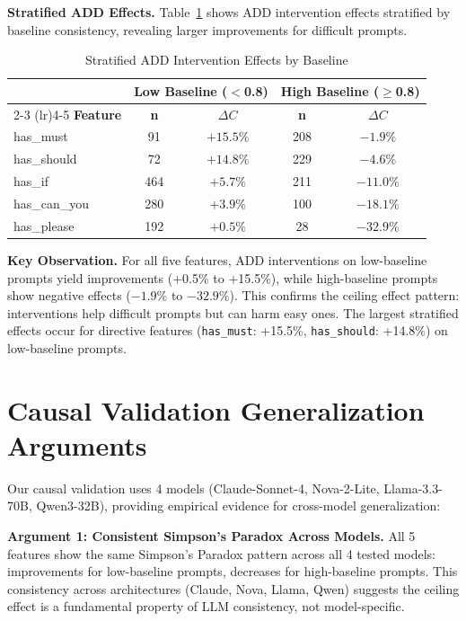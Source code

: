 \documentclass[sigconf,anonymous,review]{acmart}
\begin{document}
\textbf{Stratified ADD Effects.} Table~\ref{tab:stratified_add} shows ADD intervention effects stratified by baseline consistency, revealing larger improvements for difficult prompts.

\begin{table}[h]
\centering
\caption{Stratified ADD Intervention Effects by Baseline}
\label{tab:stratified_add}
\small
\begin{tabular}{@{}lcccc@{}}
\toprule
& \multicolumn{2}{c}{\textbf{Low Baseline ($<$0.8)}} & \multicolumn{2}{c}{\textbf{High Baseline ($\geq$0.8)}} \\
\cmidrule(lr){2-3} \cmidrule(lr){4-5}
\textbf{Feature} & \textbf{n} & \textbf{$\Delta C$} & \textbf{n} & \textbf{$\Delta C$} \\
\midrule
has\_must & 91 & $\mathbf{+15.5\%}$ & 208 & $-1.9\%$ \\
has\_should & 72 & $\mathbf{+14.8\%}$ & 229 & $-4.6\%$ \\
has\_if & 464 & $\mathbf{+5.7\%}$ & 211 & $-11.0\%$ \\
has\_can\_you & 280 & $\mathbf{+3.9\%}$ & 100 & $-18.1\%$ \\
has\_please & 192 & $\mathbf{+0.5\%}$ & 28 & $-32.9\%$ \\
\bottomrule
\end{tabular}
\end{table}

\textbf{Key Observation.} For all five features, ADD interventions on low-baseline prompts yield improvements (+0.5\% to +15.5\%), while high-baseline prompts show negative effects ($-1.9\%$ to $-32.9\%$). This confirms the ceiling effect pattern: interventions help difficult prompts but can harm easy ones. The largest stratified effects occur for directive features (\texttt{has\_must}: +15.5\%, \texttt{has\_should}: +14.8\%) on low-baseline prompts.

\section{Causal Validation Generalization Arguments}
\label{app:causal}

Our causal validation uses 4 models (Claude-Sonnet-4, Nova-2-Lite, Llama-3.3-70B, Qwen3-32B), providing empirical evidence for cross-model generalization:

\textbf{Argument 1: Consistent Simpson's Paradox Across Models.} All 5 features show the same Simpson's Paradox pattern across all 4 tested models: improvements for low-baseline prompts, decreases for high-baseline prompts. This consistency across architectures (Claude, Nova, Llama, Qwen) suggests the ceiling effect is a fundamental property of LLM consistency, not model-specific.
\end{document}
